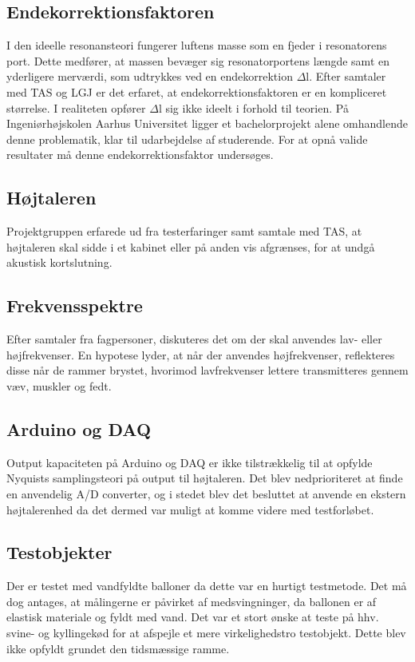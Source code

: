 \subsection{Endekorrektionsfaktoren}
I den ideelle resonansteori fungerer luftens masse som en fjeder i resonatorens port. Dette medfører, at massen bevæger sig resonatorportens længde samt en yderligere merværdi, som udtrykkes ved en endekorrektion $\Delta$l.
Efter samtaler med TAS og LGJ er det erfaret, at endekorrektionsfaktoren er en kompliceret størrelse. I realiteten opfører $\Delta$l sig ikke ideelt i forhold til teorien. På Ingeniørhøjskolen Aarhus Universitet ligger et bachelorprojekt alene omhandlende denne problematik, klar til udarbejdelse af studerende. For at opnå valide resultater må denne endekorrektionsfaktor undersøges. 

\subsection{Højtaleren}
Projektgruppen erfarede ud fra testerfaringer samt samtale med TAS, at højtaleren skal sidde i et kabinet eller på anden vis afgrænses, for at undgå akustisk kortslutning.  

\subsection{Frekvensspektre}
Efter samtaler fra fagpersoner, diskuteres det om der skal anvendes lav- eller højfrekvenser. En hypotese lyder, at når der anvendes højfrekvenser, reflekteres disse når de rammer brystet, hvorimod lavfrekvenser lettere transmitteres gennem væv, muskler og fedt.

\subsection{Arduino og DAQ}
Output kapaciteten på Arduino og DAQ er ikke tilstrækkelig til at opfylde Nyquists samplingsteori på output til højtaleren. Det blev nedprioriteret at finde en anvendelig A/D converter, og i stedet blev det besluttet at anvende en ekstern højtalerenhed da det dermed var muligt at komme videre med testforløbet. 

\subsection{Testobjekter}
Der er testet med vandfyldte balloner da dette var en hurtigt testmetode. Det må dog antages, at målingerne er påvirket af medsvingninger, da ballonen er af elastisk materiale og fyldt med vand. Det var et stort ønske at teste på hhv. svine- og kyllingekød for at afspejle et mere virkelighedstro testobjekt. Dette blev ikke opfyldt grundet den tidsmæssige ramme.  

